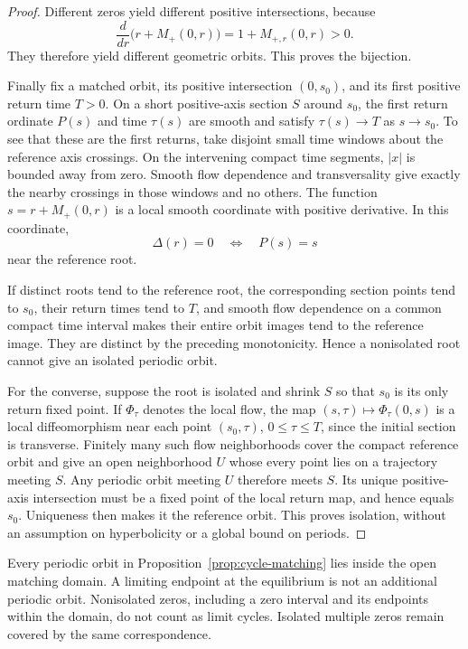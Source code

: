 \begin{proof}
Different zeros yield different positive intersections, because
\[
  \frac{d}{dr}\bigl(r+M_+(0,r)\bigr)=1+M_{+,r}(0,r)>0.
\]
They therefore yield different geometric orbits. This proves the
bijection.

Finally fix a matched orbit, its positive intersection \((0,s_0)\),
and its first positive return time \(T>0\). On a short positive-axis
section \(S\) around \(s_0\), the first return ordinate \(P(s)\)
and time \(\tau(s)\) are smooth and satisfy \(\tau(s)\to T\) as
\(s\to s_0\). To see that these are the first returns, take disjoint
small time windows about the reference axis crossings. On the
intervening compact time segments, \(|x|\) is bounded away from
zero. Smooth flow dependence and transversality give exactly the
nearby crossings in those windows and no others.
The function \(s=r+M_+(0,r)\) is a local smooth coordinate with
positive derivative. In this coordinate,
\[
  \Delta(r)=0\quad\Longleftrightarrow\quad P(s)=s
\]
near the reference root.

If distinct roots tend to the reference root, the corresponding
section points tend to \(s_0\), their return times tend to \(T\),
and smooth flow dependence on a common compact time interval makes
their entire orbit images tend to the reference image. They are
distinct by the preceding monotonicity. Hence a nonisolated root
cannot give an isolated periodic orbit.

For the converse, suppose the root is isolated and shrink \(S\)
so that \(s_0\) is its only return fixed point. If \(\Phi_\tau\)
denotes the local flow, the map
\((s,\tau)\mapsto\Phi_\tau(0,s)\) is a local diffeomorphism near
each point \((s_0,\tau)\), \(0\le\tau\le T\), since the initial
section is transverse. Finitely many such flow neighborhoods cover
the compact reference orbit and give an open neighborhood \(U\)
whose every point lies on a trajectory meeting \(S\).
Any periodic orbit meeting \(U\) therefore meets \(S\). Its unique
positive-axis intersection must be a fixed point of the local
return map, and hence equals \(s_0\). Uniqueness then makes it the
reference orbit. This proves isolation, without an assumption on
hyperbolicity or a global bound on periods.
\end{proof}

\begin{remark}
Every periodic orbit in Proposition~\ref{prop:cycle-matching} lies
inside the open matching domain. A limiting endpoint at the
equilibrium is not an additional periodic orbit. Nonisolated zeros,
including a zero interval and its endpoints within the domain,
do not count as limit cycles. Isolated multiple zeros remain
covered by the same correspondence.
\end{remark}

